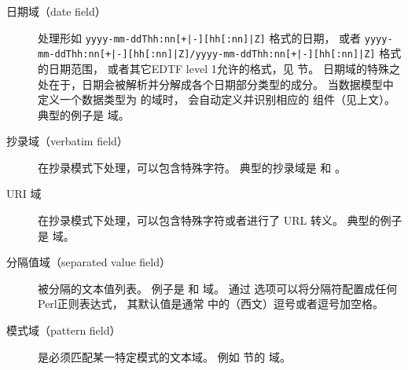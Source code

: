 \begin{description}
\begin{description}
\item[日期域（date field）] 处理形如 \texttt{yyyy-mm-ddThh:nn[+|-][hh[:nn]|Z]} 格式的日期，
或者 \texttt{yyyy-mm-ddThh:nn[+|-][hh[:nn]|Z]/yyyy-mm-ddThh:nn[+|-][hh[:nn]|Z]} 格式的日期范围，
或者其它EDTF level 1允许的格式，见  节。
日期域的特殊之处在于，日期会被解析并分解成各个日期部分类型的成分。
当数据模型中定义一个数据类型为  的域时，
会自动定义并识别相应的  组件（见上文）。
典型的例子是  域。


\item[抄录域（verbatim field）] 在抄录模式下处理，可以包含特殊字符。
典型的抄录域是  和 。

\item[URI 域] 在抄录模式下处理，可以包含特殊字符或者进行了 URL 转义。
典型的例子是  域。


\item[分隔值域（separated value field）]
被分隔的文本值列表。
例子是  和  域。
通过  选项可以将分隔符配置成任何Perl正则表达式，
其默认值是通常 \BibTeX 中的（西文）逗号或者逗号加空格。


\item[模式域（pattern field）] 是必须匹配某一特定模式的文本域。
例如  节的  域。



\end{description}
\end{description}
